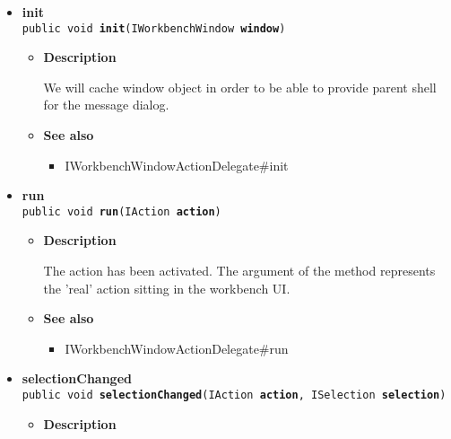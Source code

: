 {{{\begin{itemize}
{\begin{itemize}
{We can use this method to dispose of any system resources we previously allocated.
}
\item{{\bf  See also}
  \begin{itemize}
\item{ IWorkbenchWindowActionDelegate\#dispose}
  \end{itemize}
}%
\end{itemize}
}%
\item{ 
\hypertarget{it.unisa.sesa.repominer.actions.HistoryMetricsAction.init(IWorkbenchWindow)}{{\bf  init}\\}
\texttt{public void\ {\bf  init}(\texttt{IWorkbenchWindow} {\bf  window})
\label{it.unisa.sesa.repominer.actions.HistoryMetricsAction.init(IWorkbenchWindow)}}%
\begin{itemize}
\item{
{\bf  Description}

We will cache window object in order to be able to provide parent shell for the message dialog.
}
\item{{\bf  See also}
  \begin{itemize}
\item{ IWorkbenchWindowActionDelegate\#init}
  \end{itemize}
}%
\end{itemize}
}%
\item{ 
\hypertarget{it.unisa.sesa.repominer.actions.HistoryMetricsAction.run(IAction)}{{\bf  run}\\}
\texttt{public void\ {\bf  run}(\texttt{IAction} {\bf  action})
\label{it.unisa.sesa.repominer.actions.HistoryMetricsAction.run(IAction)}}%
\begin{itemize}
\item{
{\bf  Description}

The action has been activated. The argument of the method represents the 'real' action sitting in the workbench UI.
}
\item{{\bf  See also}
  \begin{itemize}
\item{ IWorkbenchWindowActionDelegate\#run}
  \end{itemize}
}%
\end{itemize}
}%
\item{ 
\hypertarget{it.unisa.sesa.repominer.actions.HistoryMetricsAction.selectionChanged(IAction, ISelection)}{{\bf  selectionChanged}\\}
\texttt{public void\ {\bf  selectionChanged}(\texttt{IAction} {\bf  action},
\texttt{ISelection} {\bf  selection})
\label{it.unisa.sesa.repominer.actions.HistoryMetricsAction.selectionChanged(IAction, ISelection)}}%
\begin{itemize}
\item{
{\bf  Description}

}
\end{itemize}}
\end{itemize}}}}
